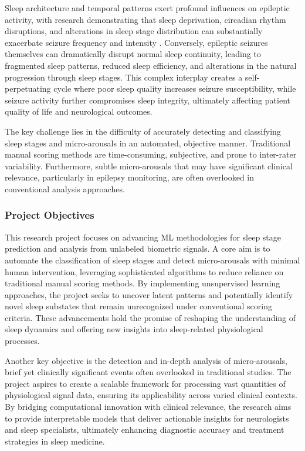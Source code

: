 \documentclass[a4paper,12pt,twoside]{article}
\begin{document}
Sleep architecture and temporal patterns exert profound influences on epileptic activity, with research demonstrating that sleep deprivation, circadian rhythm disruptions, and alterations in sleep stage distribution can substantially exacerbate seizure frequency and intensity \cite{penzel2003dynamics}. Conversely, epileptic seizures themselves can dramatically disrupt normal sleep continuity, leading to fragmented sleep patterns, reduced sleep efficiency, and alterations in the natural progression through sleep stages. This complex interplay creates a self-perpetuating cycle where poor sleep quality increases seizure susceptibility, while seizure activity further compromises sleep integrity, ultimately affecting patient quality of life and neurological outcomes.

The key challenge lies in the difficulty of accurately detecting and classifying sleep stages and micro-arousals in an automated, objective manner. Traditional manual scoring methods are time-consuming, subjective, and prone to inter-rater variability. Furthermore, subtle micro-arousals that may have significant clinical relevance, particularly in epilepsy monitoring, are often overlooked in conventional analysis approaches.

\subsubsection{Project Objectives}

This research project focuses on advancing ML methodologies for sleep stage prediction and analysis from unlabeled biometric signals. A core aim is to automate the classification of sleep stages and detect micro-arousals with minimal human intervention, leveraging sophisticated algorithms to reduce reliance on traditional manual scoring methods. By implementing unsupervised learning approaches, the project seeks to uncover latent patterns and potentially identify novel sleep substates that remain unrecognized under conventional scoring criteria. These advancements hold the promise of reshaping the understanding of sleep dynamics and offering new insights into sleep-related physiological processes.

Another key objective is the detection and in-depth analysis of micro-arousals, brief yet clinically significant events often overlooked in traditional studies. The project aspires to create a scalable framework for processing vast quantities of physiological signal data, ensuring its applicability across varied clinical contexts. By bridging computational innovation with clinical relevance, the research aims to provide interpretable models that deliver actionable insights for neurologists and sleep specialists, ultimately enhancing diagnostic accuracy and treatment strategies in sleep medicine.
\end{document}
